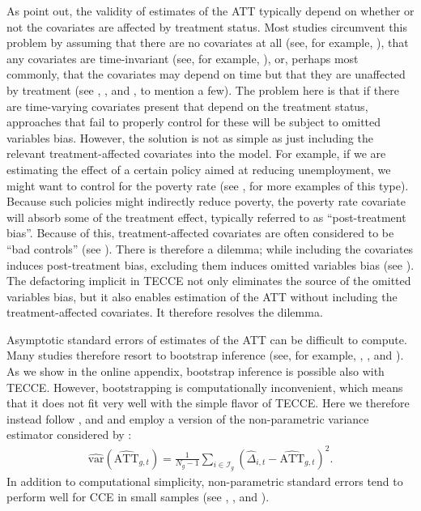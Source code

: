 \documentclass[12pt,fleqn]{article}
\begin{document}
  As \citet{Caetano_Callaway_Payne_Rodrigues_2022} point out, the validity of estimates of the ATT typically depend on whether or not the covariates are affected by treatment status. Most studies circumvent this problem by assuming that there are no covariates at all (see, for example, \citealp{brown2022generalized}), that any covariates are time-invariant (see, for example, \citealp{Callaway_Karami_2020}), or, perhaps most commonly, that the covariates may depend on time but that they are unaffected by treatment (see \citealp{chan2022pcdid}, \citealp{Gobillon_Magnac_2016}, and \citealp{Xu_2017}, to mention a few). The problem here is that if there are time-varying covariates present that depend on the treatment status, approaches that fail to properly control for these will be subject to omitted variables bias. However, the solution is not as simple as just including the relevant treatment-affected covariates into the model. For example, if we are estimating the effect of a certain policy aimed at reducing unemployment, we might want to control for the poverty rate (see \citealp{Caetano_Callaway_Payne_Rodrigues_2022}, for more examples of this type). Because such policies might indirectly reduce poverty, the poverty rate covariate will absorb some of the treatment effect, typically referred to as ``post-treatment bias''. Because of this, treatment-affected covariates are often considered to be ``bad controls'' (see \citealp{angrist2009mostly}). There is therefore a dilemma; while including the covariates induces post-treatment bias, excluding them induces omitted variables bias (see \citealp{aklin2017can}). The defactoring implicit in TECCE not only eliminates the source of the omitted variables bias, but it also enables estimation of the ATT without including the treatment-affected covariates. It therefore resolves the dilemma.
  
  Asymptotic standard errors of estimates of the ATT can be difficult to compute. Many studies therefore resort to bootstrap inference (see, for example, \citealp{Callaway_Karami_2020}, \citealp{Callaway_SantAnna_2020}, and \citealp{Xu_2017}). As we show in the online appendix, bootstrap inference is possible also with TECCE. However, bootstrapping is computationally inconvenient, which means that it does not fit very well with the simple flavor of TECCE. Here we therefore instead follow \citet{brown2022generalized}, and \citet{chan2022pcdid} and employ a version of the non-parametric variance estimator considered by \citet{pesaran2006estimation}:
  \begin{align}
  \widehat{\mathrm{var}}(\widehat{\mathrm{ATT}}_{g,t}) = \frac{1}{N_g-1}\sum_{i \in \mathcal{I}_g} (\widehat \Delta_{i,t}  - \widehat{\mathrm{ATT}}_{g,t})^2.\label{nonparametric variance estimator}
  \end{align}
  In addition to computational simplicity, non-parametric standard errors tend to perform well for CCE in small samples (see \citealp{chudik2011weak}, \citealp{pesaran2006estimation}, and \citealp{westerlund2022cce}).
  
\end{document}
